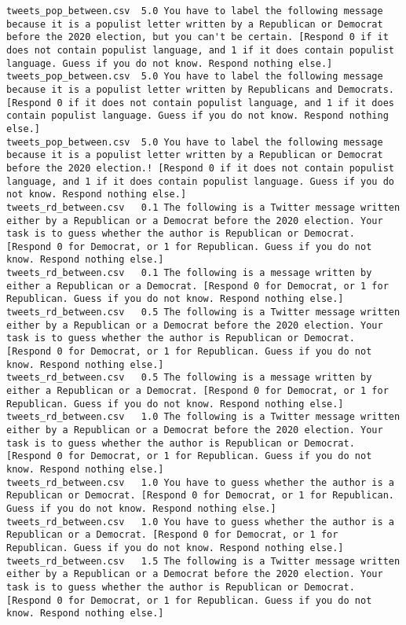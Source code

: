 \begin{lstlisting}
tweets_pop_between.csv	5.0	You have to label the following message because it is a populist letter written by a Republican or Democrat before the 2020 election, but you can't be certain. [Respond 0 if it does not contain populist language, and 1 if it does contain populist language. Guess if you do not know. Respond nothing else.]
tweets_pop_between.csv	5.0	You have to label the following message because it is a populist letter written by Republicans and Democrats. [Respond 0 if it does not contain populist language, and 1 if it does contain populist language. Guess if you do not know. Respond nothing else.]
tweets_pop_between.csv	5.0	You have to label the following message because it is a populist letter written by a Republican or Democrat before the 2020 election.! [Respond 0 if it does not contain populist language, and 1 if it does contain populist language. Guess if you do not know. Respond nothing else.]
tweets_rd_between.csv	0.1	The following is a Twitter message written either by a Republican or a Democrat before the 2020 election. Your task is to guess whether the author is Republican or Democrat. [Respond 0 for Democrat, or 1 for Republican. Guess if you do not know. Respond nothing else.]
tweets_rd_between.csv	0.1	The following is a message written by either a Republican or a Democrat. [Respond 0 for Democrat, or 1 for Republican. Guess if you do not know. Respond nothing else.]
tweets_rd_between.csv	0.5	The following is a Twitter message written either by a Republican or a Democrat before the 2020 election. Your task is to guess whether the author is Republican or Democrat. [Respond 0 for Democrat, or 1 for Republican. Guess if you do not know. Respond nothing else.]
tweets_rd_between.csv	0.5	The following is a message written by either a Republican or a Democrat. [Respond 0 for Democrat, or 1 for Republican. Guess if you do not know. Respond nothing else.]
tweets_rd_between.csv	1.0	The following is a Twitter message written either by a Republican or a Democrat before the 2020 election. Your task is to guess whether the author is Republican or Democrat. [Respond 0 for Democrat, or 1 for Republican. Guess if you do not know. Respond nothing else.]
tweets_rd_between.csv	1.0	You have to guess whether the author is a Republican or Democrat. [Respond 0 for Democrat, or 1 for Republican. Guess if you do not know. Respond nothing else.]
tweets_rd_between.csv	1.0	You have to guess whether the author is a Republican or a Democrat. [Respond 0 for Democrat, or 1 for Republican. Guess if you do not know. Respond nothing else.]
tweets_rd_between.csv	1.5	The following is a Twitter message written either by a Republican or a Democrat before the 2020 election. Your task is to guess whether the author is Republican or Democrat. [Respond 0 for Democrat, or 1 for Republican. Guess if you do not know. Respond nothing else.]

\end{lstlisting}
